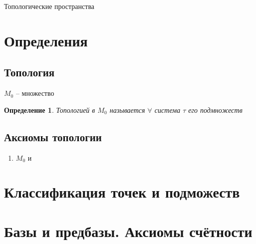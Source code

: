 \documentclass[a4paper, 12pt, titlepage]{article}
\newtheorem{Def}{Определение}[section]
\begin{document}
	\begin{center}
		\begin{Large}
			Топологические пространства
		\end{Large}
	\end{center}
	\section{Определения}
		\subsection{Топология}
			$M_0$ -- множество
			\begin{Def}
				Топологией в $M_0$ называется $\forall$ система $\tau$ его подмножеств
			\end{Def}
		\subsection{Аксиомы топологии}
			\begin{enumerate}
				\item $M_0$ и 
			\end{enumerate}
	\section{Классификация точек и подможеств}
	\section{Базы и предбазы. Аксиомы счётности}
\end{document}

